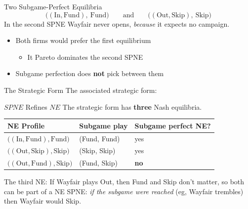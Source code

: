 \begin{frame}{Two Subgame-Perfect Equilibria}
$$\big((\text{In},\text{Fund}),\ \text{Fund}\big)
\qquad\text{and}\qquad
\big((\text{Out},\text{Skip}),\ \text{Skip}\big)$$
\vfill
In the second SPNE Wayfair never opens, \textit{because} it expects no campaign.
\bsk
\vfill
\begin{itemize}
    \item Both firms would prefer the first equilibrium
    \begin{itemize}
        \item It Pareto dominates the second SPNE
    \end{itemize}
    \item Subgame perfection does \textbf{not} pick between them
\end{itemize}
\vspace{-0.4in}
\end{frame}

\begin{frame}{The Strategic Form}
The associated strategic form:
\bsk
\centering
{\small
{}%
}
\bsk
\raggedright
{}
\vspace{-0.2in}
\end{frame}

\begin{frame}{$SPNE$ Refines $NE$}
The strategic form has \textbf{three} Nash equilibria. 
\bsk
\centering
\begin{tabular}{lll}
\textbf{NE Profile} & \textbf{Subgame play} & \textbf{Subgame perfect NE?} \\
\hline
$\big((\text{In},\text{Fund}),\text{Fund}\big)$ & (Fund, Fund) & yes \\
$\big((\text{Out},\text{Skip}),\text{Skip}\big)$ & (Skip, Skip) & yes \\
$\big((\text{Out},\text{Fund}),\text{Skip}\big)$ & (Fund, Skip) & \textbf{no} \\
\end{tabular}
\bsk
\raggedright
\vfill
The third NE: If Wayfair plays Out, then Fund and Skip don't matter, so both can be part of a NE
\bsk
SPNE: \textit{if the subgame were reached} (eg, Wayfair trembles) then Wayfair would Skip.
\vspace{0.3in}
\end{frame}

